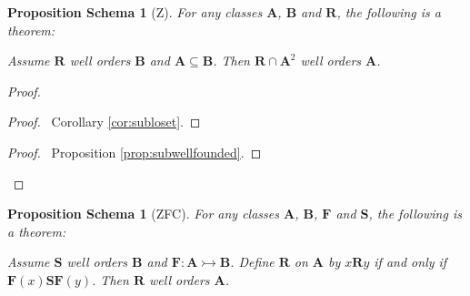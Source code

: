 \documentclass{book}
\let\qed\relax
\newtheorem{props}[ax]{Proposition Schema}
\theoremstyle{definition}
\begin{document}
\begin{props}[Z]
\label{prop:subwoset}
For any classes $\mathbf{A}$, $\mathbf{B}$ and $\mathbf{R}$, the following is a theorem:

Assume $\mathbf{R}$ well orders $\mathbf{B}$ and $\mathbf{A} \subseteq \mathbf{B}$. Then $\mathbf{R} \cap \mathbf{A}^2$ well orders $\mathbf{A}$.
\end{props}

\begin{proof}
\pf
{}
\begin{proof}
	\pf\ Corollary \ref{cor:subloset}.
\end{proof}
\begin{proof}
	\pf\ Proposition \ref{prop:subwellfounded}.
\end{proof}
\qed
\end{proof}

\begin{props}[ZFC]
For any classes $\mathbf{A}$, $\mathbf{B}$, $\mathbf{F}$ and $\mathbf{S}$, the following is a theorem:

Assume $\mathbf{S}$ well orders $\mathbf{B}$ and $\mathbf{F} : \mathbf{A} \rightarrowtail \mathbf{B}$. Define $\mathbf{R}$ on $\mathbf{A}$ by $x \mathbf{R} y$ if and only if $\mathbf{F}(x) \mathbf{S} \mathbf{F}(y)$. Then $\mathbf{R}$ well orders $\mathbf{A}$.
\end{props}
\end{document}
